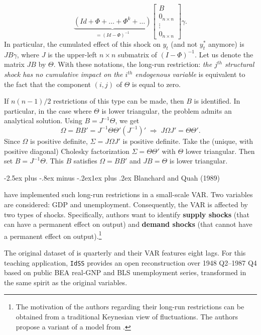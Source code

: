 \documentclass[
  11pt,
]{book}
\makeatletter
\renewcommand\subsection{\@startsection{subsection}{2}{\z@}
  {-2.5ex plus -.8ex minus -.2ex}{1ex plus .2ex}
  {\normalfont\large\bfseries\color{TextbookInk}}}
\theoremstyle{definition}
\theoremstyle{definition}
\theoremstyle{definition}
\theoremstyle{definition}
\theoremstyle{remark}
\makeatother
\begin{document}
\[
\underbrace{(Id+\Phi+\ldots+\Phi^{k}+\ldots)}_{=(Id - \Phi)^{-1}}\left[\begin{array}{c}
B \\
0_{n \times n}  \\
\vdots \\
0_{n \times n}
\end{array}\right]\gamma.
\]
In particular, the cumulated effect of this shock on \(y_t\) (and not \(y_t^*\) anymore) is \(J B \gamma\), where \(J\) is the upper-left \(n \times n\) submatrix of \((I - \Phi)^{-1}\). Let us denote the matrix \(J B\) by \(\Theta\). With these notations, the long-run restriction: \emph{the \(j^{th}\) structural shock has no cumulative impact on the \(i^{th}\) endogenous variable} is equivalent to the fact that the component \((i,j)\) of \(\Theta\) is equal to zero.

If \(n(n-1)/2\) restrictions of this type can be made, then \(B\) is identified. In particular, in the case where \(\Theta\) is lower triangular, the problem admits an analytical solution. Using \(B = J^{-1} \Theta\), we get
\[
\Omega = B B' = J^{-1} \Theta \Theta' (J^{-1})' \;\Rightarrow\; J \Omega J' = \Theta \Theta'.
\]
Since \(\Omega\) is positive definite, \(\Sigma = J \Omega J'\) is positive definite. Take the (unique, with positive diagonal) Cholesky factorization \(\Sigma = \Theta \Theta'\) with \(\Theta\) lower triangular. Then set \(B = J^{-1} \Theta\). This \(B\) satisfies \(\Omega = B B'\) and \(J B = \Theta\) is lower triangular.

\subsection{Blanchard and Quah (1989)}\label{blanchard-and-quah-1989}

\citet{Blanchard_Quah_1989} have implemented such long-run restrictions in a small-scale VAR. Two variables are considered: GDP and unemployment. Consequently, the VAR is affected by two types of shocks. Specifically, authors want to identify \textbf{supply shocks} (that can have a permanent effect on output) and \textbf{demand shocks} (that cannot have a permanent effect on output).\footnote{The motivation of the authors regarding their long-run restrictions can be obtained from a traditional Keynesian view of fluctuations. The authors propose a variant of a model from \citet{Fischer_1977}.
}

The original dataset of \citet{Blanchard_Quah_1989} is quarterly and their VAR features eight lags. For this teaching application, \texttt{IdSS} provides an open reconstruction over 1948 Q2--1987 Q4 based on public BEA real-GNP and BLS unemployment series, transformed in the same spirit as the original variables.
\end{document}
